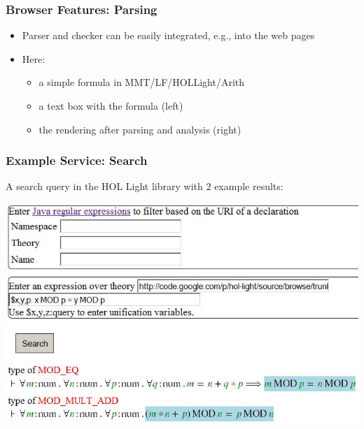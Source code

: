 \documentclass{beamer}
\begin{document}
\begin{frame}\frametitle{Browser Features: Parsing}
\begin{itemize}
\item Parser and checker can be easily integrated, e.g., into the web pages
\item Here:
 \begin{itemize}
 \item a simple formula in MMT/LF/HOLLight/Arith
 \item a text box with the formula (left)
 \item the rendering after parsing and analysis (right)
 \end{itemize}
\end{itemize}
\end{frame}

\begin{frame}\frametitle{Example Service: Search}
A search query in the HOL Light library with $2$ example results:

\includegraphics[width=\textwidth]{img/search.jpg}
\end{frame}
\end{document}
